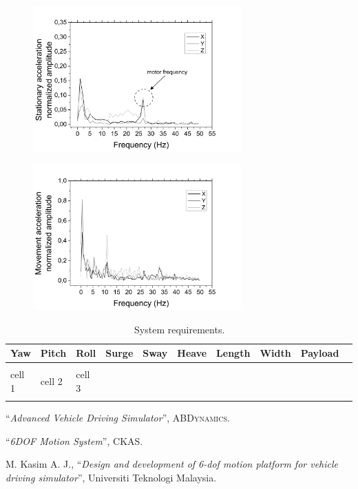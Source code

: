 \documentclass[11pt, twocolumn]{article}
\newcommand{\Virgolette}[1]{``#1''}
\begin{document}
\begin{figure}[h!]
	\centering
	\includegraphics[width=8cm]{Images/FFTStationary}
\end{figure}

\begin{figure}[h!]
	\centering
	\includegraphics[width=8cm]{Images/FFTMovement}
\end{figure}


\begin{table}[b]
\centering
\begin{changemargin}{-0.5cm}{-0.5cm}
\centering
\begin{tabular}{C{1.25cm}C{1.25cm}C{1.25cm}C{1.25cm}C{1.25cm}C{1.25cm}C{1.25cm}C{1.25cm}C{1.25cm}C{1.25cm}}
	\textbf{Yaw} & \textbf{Pitch} & \textbf{Roll} & \textbf{Surge} & \textbf{Sway} & \textbf{Heave} & \textbf{Length} & \textbf{Width} & \textbf{Payload}\\
	\hline
	\hline
	\\
	cell 1 & cell 2 & cell 3\\
	\\
	\hline
\end{tabular}
\end{changemargin}
\caption{System requirements.}
\label{t:SystemRequirements}
\end{table}


\begin{thebibliography}{}
\Virgolette{\textit{Advanced Vehicle Driving Simulator}}, \textsc{ABDynamics}.

\Virgolette{\textit{6DOF Motion System}}, \textsc{CKAS}.

M. Kasim A. J., \Virgolette{\textit{Design and development of 6-dof motion platform for vehicle driving simulator}}, Universiti Teknologi Malaysia.
\end{thebibliography}
\end{document}
